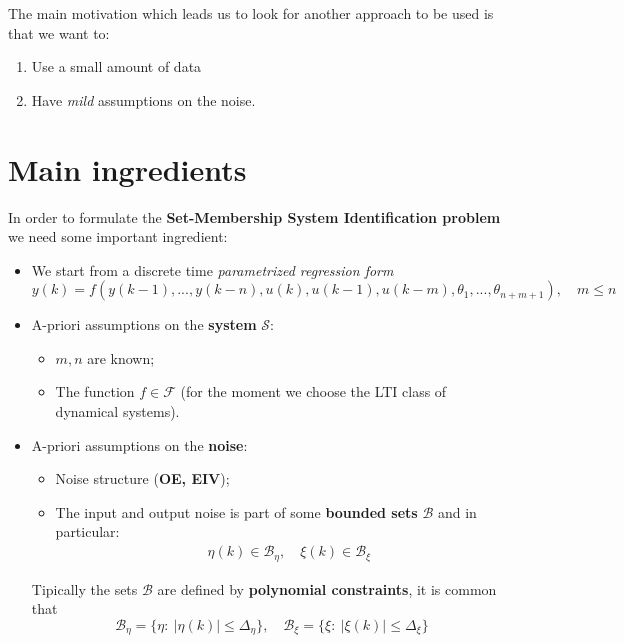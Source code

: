 The main motivation which leads us to look for another approach to be used is that we want to:
\begin{enumerate}
    \itemsep0em
    \item Use a small amount of data
    \item Have \textit{mild} assumptions on the noise.
\end{enumerate}

\section{Main ingredients}
In order to formulate the \textbf{Set-Membership System Identification problem} we need some important ingredient:
\begin{itemize}
    \itemsep0em
    \item We start from a discrete time \textit{parametrized regression form} 
    \begin{equation*}
        y(k) = f(y(k-1),...,y(k-n), u(k), u(k-1), u(k-m), \theta_1, ..., \theta_{n+m+1}), \quad m \le n
    \end{equation*}
    \item A-priori assumptions on the \textbf{system} $\mathcal{S}$:
    \begin{itemize}
        \item $m,n$ are known; 
        \item The function $f\in\mathcal{F}$ (for the moment we choose the LTI class of dynamical systems).
    \end{itemize}
    \item A-priori assumptions on the \textbf{noise}:
    \begin{itemize}
        \item Noise structure (\textbf{OE, EIV}); 
        \item The input and output noise is part of some \textbf{bounded sets} $\mathcal{B}$ and in particular:
        {\large{
            \begin{align*}
                &\eta(k)\in\mathcal{B}_\eta, \quad
                \xi(k) \in \mathcal{B}_\xi
            \end{align*}
        }}
    \end{itemize}
    Tipically the sets $\mathcal{B}$ are defined by \textbf{polynomial constraints}, it is common that
    {\large{
        \begin{equation*}
            \mathcal{B}_\eta = \{
                \eta: \ \vert \eta(k) \vert \le \Delta_\eta
            \}, \quad
            \mathcal{B}_\xi = \{
                \xi : \ \vert \xi(k) \vert \le \Delta_\xi
            \}
        \end{equation*}
    }}
\end{itemize}

